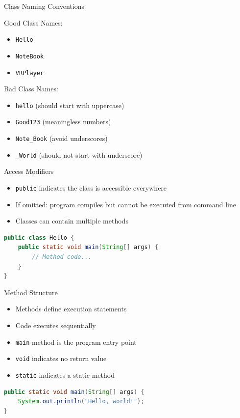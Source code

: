 \documentclass[serif, aspectratio=169]{beamer}
\begin{document}
\begin{frame}[fragile]{Class Naming Conventions}
\begin{block}{Good Class Names:}
\begin{itemize}
    \item \texttt{Hello}
    \item \texttt{NoteBook} 
    \item \texttt{VRPlayer}
\end{itemize}
\end{block}

\begin{block}{Bad Class Names:}
\begin{itemize}
    \item \texttt{hello} (should start with uppercase)
    \item \texttt{Good123} (meaningless numbers)
    \item \texttt{Note\_Book} (avoid underscores)
    \item \texttt{\_World} (should not start with underscore)
\end{itemize}
\end{block}
\end{frame}

\begin{frame}[fragile]{Access Modifiers}
\begin{itemize}
    \item \texttt{public} indicates the class is accessible everywhere
    \item If omitted: program compiles but cannot be executed from command line
    \item Classes can contain multiple methods
\end{itemize}

\begin{lstlisting}[language=Java]
public class Hello {
    public static void main(String[] args) {
        // Method code...
    }
}
\end{lstlisting}
\end{frame}

\begin{frame}[fragile]{Method Structure}
\begin{itemize}
    \item Methods define execution statements
    \item Code executes sequentially
    \item \texttt{main} method is the program entry point
    \item \texttt{void} indicates no return value
    \item \texttt{static} indicates a static method
\end{itemize}

\begin{lstlisting}[language=Java]
public static void main(String[] args) {
    System.out.println("Hello, world!");
}
\end{lstlisting}
\end{frame}
\end{document}
